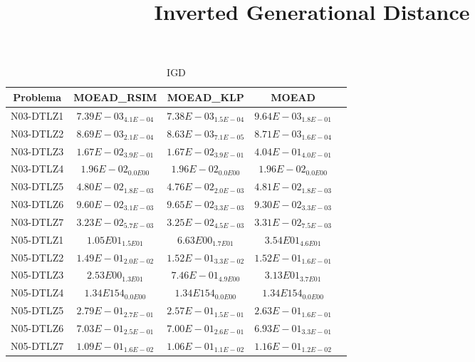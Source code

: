 \documentclass{article}
\title{Inverted Generational Distance}
\author{}
\begin{document}
\maketitle
\begin{table*}[ht!]
\scriptsize
\caption{IGD}
\centering\begin{tabular}{|c||c||c||c||c|} \hline
Problema &MOEAD_RSIM &MOEAD_KLP &MOEAD\\\hline
N03-DTLZ1 &\cellcolor{gray25}$7.39E-03_{4.1E-04}$ &\cellcolor{gray95}$7.38E-03_{1.5E-04}$ &$9.64E-03_{1.8E-01}$\\ 
\hline
N03-DTLZ2 &\cellcolor{gray25}$8.69E-03_{2.1E-04}$ &\cellcolor{gray95}$8.63E-03_{7.1E-05}$ &$8.71E-03_{1.6E-04}$\\ 
\hline
N03-DTLZ3 &\cellcolor{gray95}$1.67E-02_{3.9E-01}$ &\cellcolor{gray25}$1.67E-02_{3.9E-01}$ &$4.04E-01_{4.0E-01}$\\ 
\hline
N03-DTLZ4 &\cellcolor{gray95}$1.96E-02_{0.0E00}$ &\cellcolor{gray25}$1.96E-02_{0.0E00}$ &$1.96E-02_{0.0E00}$\\ 
\hline
N03-DTLZ5 &\cellcolor{gray25}$4.80E-02_{1.8E-03}$ &\cellcolor{gray95}$4.76E-02_{2.0E-03}$ &$4.81E-02_{1.8E-03}$\\ 
\hline
N03-DTLZ6 &\cellcolor{gray25}$9.60E-02_{3.1E-03}$ &$9.65E-02_{3.3E-03}$ &\cellcolor{gray95}$9.30E-02_{3.3E-03}$\\ 
\hline
N03-DTLZ7 &\cellcolor{gray95}$3.23E-02_{5.7E-03}$ &\cellcolor{gray25}$3.25E-02_{4.5E-03}$ &$3.31E-02_{7.5E-03}$\\ 
\hline
N05-DTLZ1 &\cellcolor{gray25}$1.05E01_{1.5E01}$ &\cellcolor{gray95}$6.63E00_{1.7E01}$ &$3.54E01_{4.6E01}$\\ 
\hline
N05-DTLZ2 &\cellcolor{gray95}$1.49E-01_{2.0E-02}$ &\cellcolor{gray25}$1.52E-01_{3.3E-02}$ &$1.52E-01_{1.6E-01}$\\ 
\hline
N05-DTLZ3 &\cellcolor{gray25}$2.53E00_{1.3E01}$ &\cellcolor{gray95}$7.46E-01_{4.9E00}$ &$3.13E01_{3.7E01}$\\ 
\hline
N05-DTLZ4 &\cellcolor{gray95}$1.34E154_{0.0E00}$ &\cellcolor{gray25}$1.34E154_{0.0E00}$ &$1.34E154_{0.0E00}$\\ 
\hline
N05-DTLZ5 &$2.79E-01_{2.7E-01}$ &\cellcolor{gray95}$2.57E-01_{1.5E-01}$ &\cellcolor{gray25}$2.63E-01_{1.6E-01}$\\ 
\hline
N05-DTLZ6 &$7.03E-01_{2.5E-01}$ &\cellcolor{gray25}$7.00E-01_{2.6E-01}$ &\cellcolor{gray95}$6.93E-01_{3.3E-01}$\\ 
\hline
N05-DTLZ7 &\cellcolor{gray25}$1.09E-01_{1.6E-02}$ &\cellcolor{gray95}$1.06E-01_{1.1E-02}$ &$1.16E-01_{1.2E-02}$\\ 

\end{tabular}
\end{table*}
\end{document}
